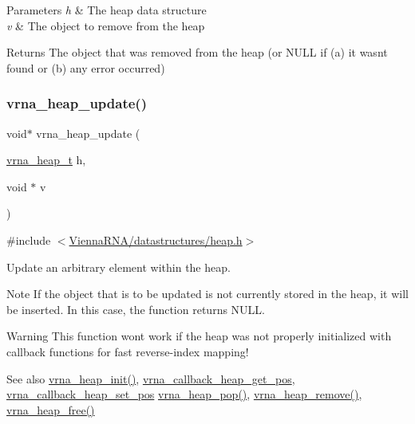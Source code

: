 \begin{DoxyParams}{Parameters}
{\em h} & The heap data structure \\
\hline
{\em v} & The object to remove from the heap \\
\hline
\end{DoxyParams}
\begin{DoxyReturn}{Returns}
The object that was removed from the heap (or N\+U\+LL if (a) it wasn\textquotesingle{}t found or (b) any error occurred) 
\end{DoxyReturn}
\mbox{\label{group__heap__utils_gabdd04b8719b3d85c5ad53ed7dec9700b}} 
\subsubsection{\texorpdfstring{vrna\_heap\_update()}{vrna\_heap\_update()}}
{\footnotesize\ttfamily void$\ast$ vrna\+\_\+heap\+\_\+update (\begin{DoxyParamCaption}\item[{\mbox{\hyperlink{group__heap__utils_ga341ea87a651145b986792f6eb3e679c3}{vrna\+\_\+heap\+\_\+t}}}]{h,  }\item[{void $\ast$}]{v }\end{DoxyParamCaption})}



{\ttfamily \#include $<$\mbox{\hyperlink{heap_8h}{Vienna\+R\+N\+A/datastructures/heap.\+h}}$>$}



Update an arbitrary element within the heap. 

\begin{DoxyNote}{Note}
If the object that is to be updated is not currently stored in the heap, it will be inserted. In this case, the function returns N\+U\+LL.
\end{DoxyNote}
\begin{DoxyWarning}{Warning}
This function won\textquotesingle{}t work if the heap was not properly initialized with callback functions for fast reverse-\/index mapping!
\end{DoxyWarning}
\begin{DoxySeeAlso}{See also}
\mbox{\hyperlink{group__heap__utils_gafd02db4841338bad6f551e3e2bd2161f}{vrna\+\_\+heap\+\_\+init()}}, \mbox{\hyperlink{group__heap__utils_ga15f9e17d8168f2d7edc43a282ff44f5e}{vrna\+\_\+callback\+\_\+heap\+\_\+get\+\_\+pos}}, \mbox{\hyperlink{group__heap__utils_ga00acf19f3af4792fb2f3b1d01b32fc61}{vrna\+\_\+callback\+\_\+heap\+\_\+set\+\_\+pos}} \mbox{\hyperlink{group__heap__utils_ga3b6242f3a1194eb1df2d1fb40d630610}{vrna\+\_\+heap\+\_\+pop()}}, \mbox{\hyperlink{group__heap__utils_ga5e181d5ef8557d502943b938620c7174}{vrna\+\_\+heap\+\_\+remove()}}, \mbox{\hyperlink{group__heap__utils_ga2a4915c6e66b8831644857df0715c3ce}{vrna\+\_\+heap\+\_\+free()}}
\end{DoxySeeAlso}

